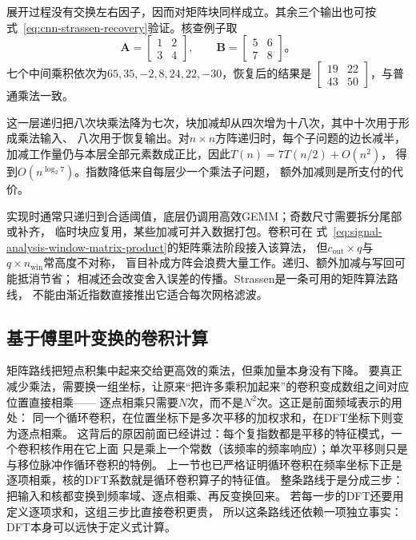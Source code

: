 展开过程没有交换左右因子，因而对矩阵块同样成立。其余三个输出也可按式~\eqref{eq:cnn-strassen-recovery}验证。核查例子取
\[
  \bm A=\begin{bmatrix}1&2\\3&4\end{bmatrix},\qquad
  \bm B=\begin{bmatrix}5&6\\7&8\end{bmatrix}\text{。}
\]
七个中间乘积依次为$65,35,-2,8,24,22,-30$，恢复后的结果是
$\left[\begin{smallmatrix}19&22\\43&50\end{smallmatrix}\right]$，与普通乘法一致。

这一层递归把八次块乘法降为七次，块加减却从四次增为十八次，其中十次用于形成乘法输入、
八次用于恢复输出。对$n\times n$方阵递归时，每个子问题的边长减半，
加减工作量仍与本层全部元素数成正比，因此$T(n)=7T(n/2)+O(n^2)$，
得到$O(n^{\log_2 7})$。指数降低来自每层少一个乘法子问题，
额外加减则是所支付的代价。

实现时通常只递归到合适阈值，底层仍调用高效GEMM；奇数尺寸需要拆分尾部或补齐，
临时块应复用，某些加减可并入数据打包。卷积可在
式~\eqref{eq:signal-analysis-window-matrix-product}的矩阵乘法阶段接入该算法，
但$c_{\mathrm{out}}\times q$与$q\times n_{\mathrm{win}}$常高度不对称，
盲目补成方阵会浪费大量工作。递归、额外加减与写回可能抵消节省；
相减还会改变舍入误差的传播。Strassen是一条可用的矩阵算法路线，
不能由渐近指数直接推出它适合每次网格滤波。

\subsection{基于傅里叶变换的卷积计算}\label{sec:signal-analysis-fast-fft}\label{sec:cnn-fft}

矩阵路线把短点积集中起来交给更高效的乘法，但乘加量本身没有下降。
要真正减少乘法，需要换一组坐标，让原来“把许多乘积加起来”的卷积变成数组之间对应位置直接相乘——
逐点相乘只需要$N$次，而不是$N^2$次。这正是前面频域表示的用处：
同一个循环卷积，在位置坐标下是多次平移的加权求和，在DFT坐标下则变为逐点相乘。
这背后的原因前面已经讲过：每个复指数都是平移的特征模式，一个卷积核作用在它上面
只是乘上一个常数（该频率的频率响应）；单次平移则只是与移位脉冲作循环卷积的特例。
上一节也已严格证明循环卷积在频率坐标下正是逐项相乘，核的DFT系数就是循环卷积算子的特征值。
整条路线于是分成三步：把输入和核都变换到频率域、逐点相乘、再反变换回来。
若每一步的DFT还要用定义逐项求和，这组三步比直接卷积更贵，
所以这条路线还依赖一项独立事实：DFT本身可以远快于定义式计算。


